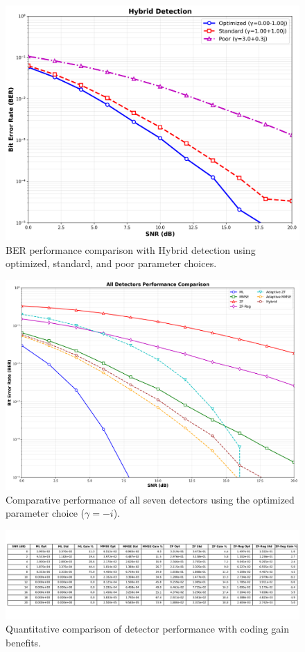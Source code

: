 \begin{figure}[!t]
\centering
\includegraphics[width=0.9\columnwidth]{figures/hybrid_detection.png}
\caption{BER performance comparison with Hybrid detection using optimized, standard, and poor parameter choices.}
\label{fig:hybrid_plot}
\end{figure}

\begin{figure}[!t]
\centering
\includegraphics[width=0.9\columnwidth]{figures/all_detectors_comparison.png}
\caption{Comparative performance of all seven detectors using the optimized parameter choice (\(\gamma = -i\)).}
\label{fig:all_detectors}
\end{figure}

\begin{figure}[!t]
\centering
\includegraphics[width=0.95\columnwidth]{figures/performance_table.png}
\caption{Quantitative comparison of detector performance with coding gain benefits.}
\label{tab:performance}
\end{figure}

